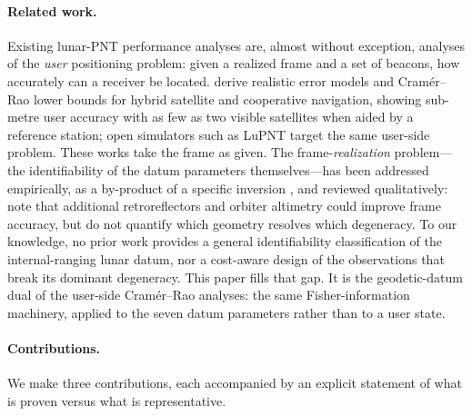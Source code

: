 \paragraph{Related work.}
Existing lunar-PNT performance analyses are, almost without exception, analyses of
the \emph{user} positioning problem: given a realized frame and a set of beacons,
how accurately can a receiver be located. \citet{pohlmann2025hybrid} derive
realistic error models and Cram\'er--Rao lower bounds for hybrid satellite and
cooperative navigation, showing sub-metre user accuracy with as few as two visible
satellites when aided by a reference station; open simulators such as LuPNT
\citep{iiyama2023lupnt} target the same user-side problem. These works take the frame as given. The
frame-\emph{realization} problem---the identifiability of the datum parameters
themselves---has been addressed empirically, as a by-product of a specific
inversion \citep{sosnica2025ilrf}, and reviewed qualitatively:
\citet{fienga2024moonlight} note that additional retroreflectors and orbiter
altimetry could improve frame accuracy, but do not quantify which geometry
resolves which degeneracy. To our knowledge, no prior work provides a general
identifiability classification of the internal-ranging lunar datum, nor a
cost-aware design of the observations that break its dominant degeneracy. This
paper fills that gap. It is the geodetic-datum dual of the user-side Cram\'er--Rao
analyses: the same Fisher-information machinery, applied to the seven datum
parameters rather than to a user state.

\paragraph{Contributions.}
We make three contributions, each accompanied by an explicit statement of what is
proven versus what is representative.


